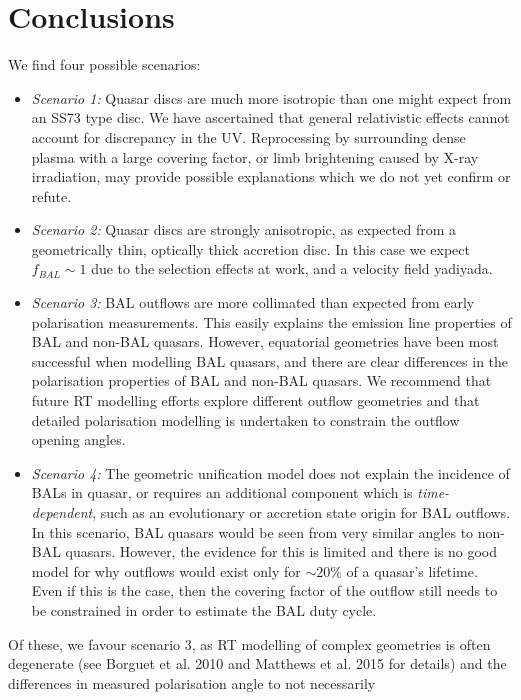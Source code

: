 \section{Conclusions}

We find four possible scenarios:

\begin{itemize}
	\item {\sl Scenario 1:} Quasar discs are much more isotropic than one might expect from an SS73 type disc.
    We have ascertained that general relativistic effects cannot account for discrepancy in the UV. Reprocessing by surrounding dense plasma with a large covering factor, or limb brightening caused by X-ray irradiation, may provide possible explanations which we do not yet confirm or refute.
    \smallskip
	\item {\sl Scenario 2:} Quasar discs are strongly anisotropic, as expected from a geometrically thin, optically thick accretion disc. In this case we expect $f_{BAL} \sim 1$ 
	due to the selection effects at work, and a velocity field yadiyada.
	\smallskip
	\item {\sl Scenario 3:} BAL outflows are more collimated than expected from early
	polarisation measurements. This easily explains the emission line properties of BAL 
	and non-BAL quasars. However, equatorial geometries have been most successful when modelling
	BAL quasars, and there are clear differences in the polarisation properties of BAL and
	non-BAL quasars. We recommend that future RT modelling efforts explore different outflow geometries and that detailed polarisation modelling is undertaken to constrain the outflow opening angles.
	\smallskip
	\item  {\sl Scenario 4:} The geometric unification model does not explain the incidence of BALs in quasar, or requires an additional component which is {\em time-dependent}, such as an evolutionary or accretion state origin for BAL outflows. In this scenario, BAL quasars would be seen from very similar angles to non-BAL quasars. However, the evidence for this is limited and there is no good model for why outflows would exist only
	for $\sim 20\%$ of a quasar's lifetime. Even if this is the case, then the covering factor of the outflow still needs to be constrained in order to estimate the BAL duty cycle.
\end{itemize}
Of these, we favour scenario 3, as RT modelling of complex geometries is often degenerate
(see Borguet et al. 2010 and Matthews et al. 2015 for details) and the differences in measured
polarisation angle to not necessarily 

